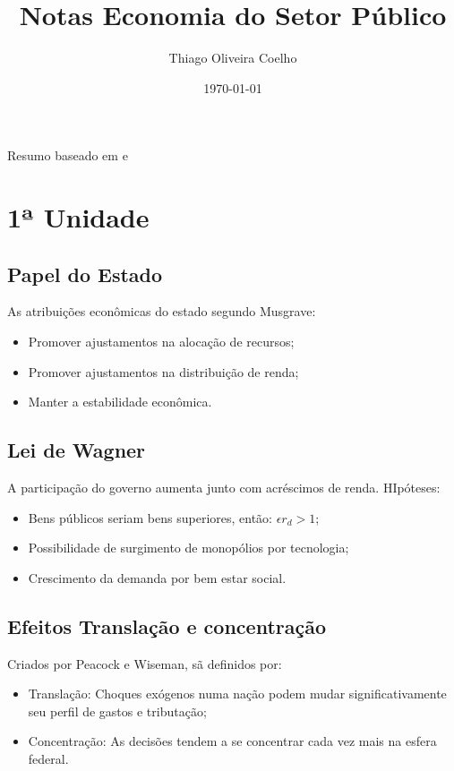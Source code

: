 \documentclass[12pt,a4paper,oneside,brazil]{abntex2}
\title{Notas Economia do Setor Público}
\author{Thiago Oliveira Coelho}
\date{\today}
\begin{document}
\pagestyle{plain}

\maketitle
\begin{center}
Resumo baseado em \cite{rezende} e \cite{biderman} 
\end{center}
\tableofcontents
\chapter{1ª Unidade}

\section{Papel do Estado} 
As atribuições econômicas do estado segundo Musgrave:
\begin{itemize}
\item Promover ajustamentos na alocação de recursos;
\item Promover ajustamentos na distribuição de renda;
\item Manter a estabilidade econômica.
\end{itemize}

\section{Lei de Wagner}
A participação do governo aumenta junto com acréscimos de renda. HIpóteses:
\begin{itemize}
\item Bens públicos seriam bens superiores, então: $ \epsilon r_d >1$;
\item Possibilidade de surgimento de monopólios por tecnologia;
\item Crescimento da demanda por bem estar social.
\end{itemize}

\section{Efeitos Translação e concentração}
Criados por Peacock e Wiseman, sã definidos por:
\begin{itemize}
\item Translação: Choques exógenos numa nação podem mudar significativamente seu perfil de gastos e tributação;
\item Concentração: As decisões tendem a se concentrar cada vez mais na esfera federal.
\end{itemize}
\end{document}
